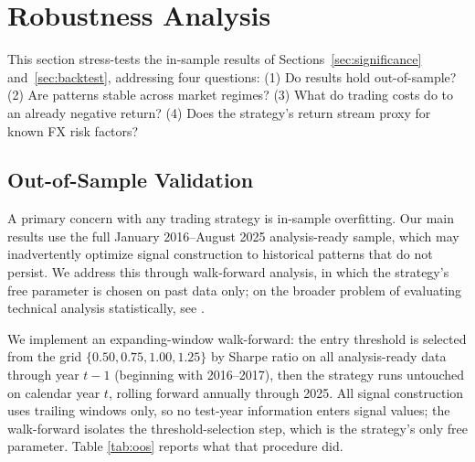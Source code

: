 \documentclass[11pt]{article}
\begin{document}
\section{Robustness Analysis}
\label{sec:robustness}

This section stress-tests the in-sample results of Sections~\ref{sec:significance} and~\ref{sec:backtest}, addressing four questions: (1) Do results hold out-of-sample? (2) Are patterns stable across market regimes? (3) What do trading costs do to an already negative return? (4) Does the strategy's return stream proxy for known FX risk factors?

\subsection{Out-of-Sample Validation}
\label{sec:oos}

A primary concern with any trading strategy is in-sample overfitting. Our main results use the full January 2016--August 2025 analysis-ready sample, which may inadvertently optimize signal construction to historical patterns that do not persist. We address this through walk-forward analysis, in which the strategy's free parameter is chosen on past data only; on the broader problem of evaluating technical analysis statistically, see \citet{lo2000foundations}.

We implement an expanding-window walk-forward: the entry threshold is selected from the grid $\{0.50, 0.75, 1.00, 1.25\}$ by Sharpe ratio on all analysis-ready data through year $t-1$ (beginning with 2016--2017), then the strategy runs untouched on calendar year $t$, rolling forward annually through 2025. All signal construction uses trailing windows only, so no test-year information enters signal values; the walk-forward isolates the threshold-selection step, which is the strategy's only free parameter. Table \ref{tab:oos} reports what that procedure did.
\end{document}
